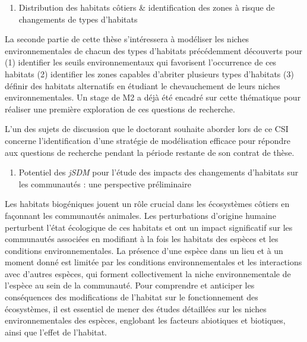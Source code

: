 \begin{enumerate}
\def\labelenumi{\arabic{enumi}.}
\setcounter{enumi}{1}
\tightlist
\item
  Distribution des habitats côtiers \& identification des zones à risque
  de changements de types d'habitats
\end{enumerate}

La seconde partie de cette thèse s'intéressera à modéliser les niches
environnementales de chacun des types d'habitats précédemment découverts
pour (1) identifier les seuils environnementaux qui favorisent
l'occurrence de ces habitats (2) identifier les zones capables d'abriter
plusieurs types d'habitats (3) définir des habitats alternatifs en
étudiant le chevauchement de leurs niches environnementales. Un stage de
M2 a déjà été encadré sur cette thématique pour réaliser une première
exploration de ces questions de recherche.

L'un des sujets de discussion que le doctorant souhaite aborder lors de
ce CSI concerne l'identification d'une stratégie de modélisation
efficace pour répondre aux questions de recherche pendant la période
restante de son contrat de thèse.

\begin{enumerate}
\def\labelenumi{\arabic{enumi}.}
\setcounter{enumi}{2}
\tightlist
\item
  Potentiel des \emph{jSDM} pour l'étude des impacts des changements
  d'habitats sur les communautés : une perspective préliminaire
\end{enumerate}

Les habitats biogéniques jouent un rôle crucial dans les écosystèmes
côtiers en façonnant les communautés animales. Les perturbations
d'origine humaine perturbent l'état écologique de ces habitats et ont un
impact significatif sur les communautés associées en modifiant à la fois
les habitats des espèces et les conditions environnementales. La
présence d'une espèce dans un lieu et à un moment donné est limitée par
les conditions environnementales et les interactions avec d'autres
espèces, qui forment collectivement la niche environnementale de
l'espèce au sein de la communauté. Pour comprendre et anticiper les
conséquences des modifications de l'habitat sur le fonctionnement des
écosystèmes, il est essentiel de mener des études détaillées sur les
niches environnementales des espèces, englobant les facteurs abiotiques
et biotiques, ainsi que l'effet de l'habitat.

